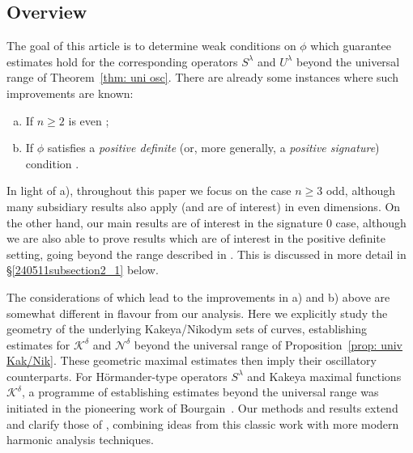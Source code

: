 \documentclass[reqno]{amsart}
\numberwithin{equation}{section}
\newcommand{\cK}{\mathcal{K}}
\newcommand{\cN}{\mathcal{N}}
\theoremstyle{plain}
\theoremstyle{definition}
\begin{document}


\subsection{Overview} The goal of this article is to determine weak conditions on $\phi$ which guarantee estimates hold for the corresponding operators $S^{\lambda}$ and $U^{\lambda}$ beyond the universal range of Theorem~\ref{thm: uni osc}. There are already some instances where such improvements are known:
\begin{enumerate}[a)]
    \item If $n \geq 2$ is even \cite{BG2011};
    \item If $\phi$ satisfies a \textit{positive definite} (or, more generally, a \textit{positive signature}) condition \cite{GHI2019, HI2022}.
\end{enumerate}
In light of a), throughout this paper we focus on the case $n \geq 3$ odd, although many subsidiary results also apply (and are of interest) in even dimensions. On the other hand, our main results are of interest in the signature $0$ case, although we are also able to prove results which are of interest in the positive definite setting, going beyond the range described in \cite{GHI2019}. This is discussed in more detail in \S\ref{240511subsection2_1} below.

The considerations of \cite{BG2011, GHI2019, HI2022} which lead to the improvements in a) and b) above are somewhat different in flavour from our analysis. Here we explicitly study the geometry of the underlying Kakeya/Nikodym sets of curves, establishing estimates for $\cK^{\delta}$ and $\cN^{\delta}$ beyond the universal range of Proposition~\ref{prop: univ Kak/Nik}. These geometric maximal estimates then imply their oscillatory counterparts. For H\"ormander-type operators $S^{\lambda}$ and Kakeya maximal functions $\cK^{\delta}$, a programme of establishing estimates beyond the universal range was initiated in the pioneering work of Bourgain~\cite{Bourgain1991}. Our methods and results extend and clarify those of \cite{Bourgain1991}, combining ideas from this classic work with more modern harmonic analysis techniques.



\end{document}
